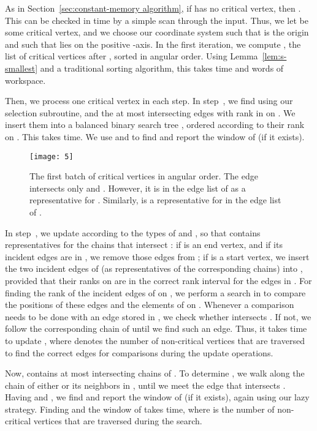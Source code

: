 \documentclass[11pt, a4paper]{article}
\begin{document}
As in Section~\ref{sec:constant-memory algorithm}, if  has 
no critical vertex, then . This can be checked
in  time by a simple scan through the input.
Thus, we let  be some critical vertex, and 
we choose our coordinate system such that
 is the origin and such that  lies on the positive -axis.
In the first iteration, we compute , 
the list of  critical vertices after , sorted in angular 
order. Using Lemma~\ref{lem:s-smallest} and a traditional sorting 
algorithm, this takes  time and  words of 
workspace.

Then, we process one critical vertex in each step.
In step~, we find  using our selection subroutine, and 
the at most  intersecting edges with rank in 
 on . We insert them into a balanced 
binary search tree , ordered according to their rank on . 
This takes  time.
We use  and  to find and report the window of  
(if it exists).

\begin{figure}
 \centering 
 \texttt{[image: 5]}
\caption{The first batch  of  critical vertices 
  in angular order. The edge  intersects only  and .
  However, it is in the edge list of  as a representative for .
  Similarly,  is a representative for  in the edge list 
  of .}
\label{fig:fig5}
\end{figure}


In step~, 
we update  according to the types of  
and  , so that  contains representatives for 
the chains that intersect : if 
 is an end vertex, and if its incident edges are in ,
we remove those edges from ;
if  is a start vertex, we insert the two incident edges
of  
(as representatives of the corresponding chains)
into , provided that their ranks on  
are in the correct rank interval for the edges in .
For finding the rank of the incident edges of  on , we 
perform a 
search in  to compare the positions of these edges and the
elements of  on .
Whenever a comparison needs to be 
done with an edge  stored in , we check whether 
intersects . If not, we follow the corresponding chain of 
until we find such an edge.
Thus, it takes  time to update , where
 denotes the number of non-critical vertices that are traversed
to find the correct edges for comparisons during the update
operations. 

Now,  contains 
at most  intersecting chains of . To determine  
, we walk along the chain of either  
or its neighbors in , until we meet the edge that 
intersects .
Having  and , we find and report
the window of  (if it exists), again using our lazy strategy.
Finding  and the window of 
takes  time, where  is the number of non-critical
vertices that are traversed during the search. 
\end{document}
